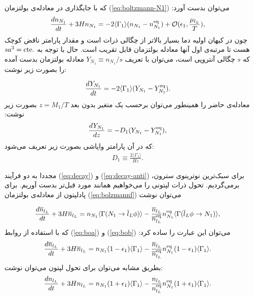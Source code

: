 \documentclass[a4paper]{book}
\begin{document}
که با جایگذاری در معادله‌ی بولتزمان (\ref{eq:boltzmann-N1}) می‌توان بدست آورد:
{\footnotesize\begin{align}
	\frac{dn_{N_1}}{dt}+3Hn_{N_1} =-2 \langle\Gamma_1\rangle (n_{N_1}-n_{N_1}^{\rm eq})+\mathcal{O}(\epsilon_1,\frac{\mu_{l_L}}{T}),
\end{align}}
چون در کیهان اولیه دما بسیار بالاتر از چگالی ذرات است و مقدار پارامتر ناقض  کوچک هست تا مرتبه‌ی اول آنها معادله بولتزمان قابل تقریب است. حال با توجه به {\footnotesize$sa^3=\rm cte.$} که {\footnotesize$s$} چگالی آنتروپی است، می‌توان با تعریف {\footnotesize$Y_{N_1} \equiv n_{N_1}/s$} معادله بولتزمان بدست آمده را بصورت زیر نوشت:
\par
\vspace{-0.5cm}
{\footnotesize\begin{align}
	\frac{dY_{N_1}}{dt} = -2 \langle\Gamma_1\rangle (Y_{N_1} - Y_{N_1}^{\rm eq}).
\end{align}}
معادله‌ی حاضر را همینطور می‌توان برحسب یک متغیر بدون بعد {\footnotesize$z=M_1/T$} بصورت زیر نوشت:
{\footnotesize\begin{align}
	\frac{dY_{N_1}}{dz} = -D_1 (Y_{N_1} - Y_{N_1}^{\rm eq}),
	\label{eq:boltzmannf-N1}
\end{align}}
که در آن پارامتر واپاشی بصورت زیر تعریف می‌شود:
{\footnotesize\begin{align}
	D_1 \equiv \frac{2\langle\Gamma_1\rangle}{Hz}.
	\label{eq:decay-parameter}
\end{align}}

مجددا به دو فرآیند (\ref{eq:decay}) و (\ref{eq:decay-anti}) برای سبک‌ترین نوترینوی سترون، برمی‌گردیم. تحول ذرات لپتونی را می‌خواهیم همانند مورد قبل‌تر بدست آوریم. برای پادلپتون از معادله‌ی بولتزمان (\ref{eq:bolzmannf}) می‌توان نوشت
\par
\vspace{-0.5cm}
{\footnotesize\begin{align}
	\frac{d\overline{n}_{l_L}}{dt}+3H\overline{n}_{l_L} = n_{N_1}  \langle\Gamma(N_1 \to \overline{l}_L \phi)\rangle - \frac{\overline{n}_{l_L}}{\overline{n}_{l_L}^{\rm eq}} n_{N_1}^{\rm eq} \langle\Gamma(\overline{l}_L \phi \to N_1)\rangle,
\end{align}}
که با استفاده از روابط (\ref{eq:boa}) و (\ref{eq:bob}) می‌توان این عبارت را ساده کرد:
{\footnotesize\begin{align}
	\frac{d\overline{n}_{l_L}}{dt}+3H\overline{n}_{l_L} = n_{N_1} (1-\epsilon_1) \langle\Gamma_1\rangle - \frac{\overline{n}_{l_L}}{\overline{n}_{l_L}^{\rm eq}} n_{N_1}^{\rm eq} (1-\epsilon_{1}) \langle\Gamma_1\rangle.
	\label{eq:boltzmannf-l}
\end{align}}
بطریق مشابه می‌توان برای تحول لپتون می‌توان نوشت:
{\footnotesize\begin{align}
	\frac{dn_{l_L}}{dt}+3Hn_{l_L} = n_{N_1} (1+\epsilon_1) \langle\Gamma_1\rangle - \frac{n_{l_L}}{n_{l_L}^{\rm eq}} n_{N_1}^{\rm eq} (1+\epsilon_1) \langle\Gamma_1\rangle.
	\label{eq:boltzmannf-antil}
\end{align}}
\end{document}
